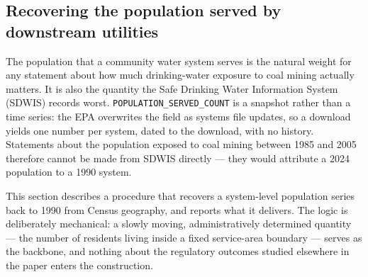 
\subsection{Recovering the population served by downstream utilities}
\label{sec:backcasting}

The population that a community water system serves is the natural weight for
any statement about how much drinking-water exposure to coal mining actually
matters. It is also the quantity the Safe Drinking Water Information System
(SDWIS) records worst. \texttt{POPULATION\_SERVED\_COUNT} is a snapshot rather
than a time series: the EPA overwrites the field as systems file updates, so a
download yields one number per system, dated to the download, with no history.
Statements about the population exposed to coal mining between 1985 and 2005
therefore cannot be made from SDWIS directly --- they would attribute a 2024
population to a 1990 system.

This section describes a procedure that recovers a system-level population
series back to 1990 from Census geography, and reports what it delivers. The
logic is deliberately mechanical: a slowly moving, administratively determined
quantity --- the number of residents living inside a fixed service-area boundary
--- serves as the backbone, and nothing about the regulatory outcomes studied
elsewhere in the paper enters the construction.

